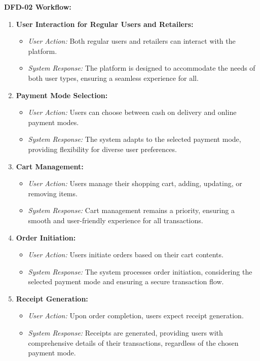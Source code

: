 \documentclass[a4paper,12pt]{article}
\begin{document}
\textbf{DFD-02 Workflow:}
\begin{enumerate}

\item \textbf{User Interaction for Regular Users and Retailers:}
   \begin{itemize}
      \item \textit{User Action:} Both regular users and retailers can interact with the platform.
      \item \textit{System Response:} The platform is designed to accommodate the needs of both user types, ensuring a seamless experience for all.
   \end{itemize}

\item \textbf{Payment Mode Selection:}
   \begin{itemize}
      \item \textit{User Action:} Users can choose between cash on delivery and online payment modes.
      \item \textit{System Response:} The system adapts to the selected payment mode, providing flexibility for diverse user preferences.
   \end{itemize}

\item \textbf{Cart Management:}
   \begin{itemize}
      \item \textit{User Action:} Users manage their shopping cart, adding, updating, or removing items.
      \item \textit{System Response:} Cart management remains a priority, ensuring a smooth and user-friendly experience for all transactions.
   \end{itemize}

\item \textbf{Order Initiation:}
   \begin{itemize}
      \item \textit{User Action:} Users initiate orders based on their cart contents.
      \item \textit{System Response:} The system processes order initiation, considering the selected payment mode and ensuring a secure transaction flow.
   \end{itemize}

\item \textbf{Receipt Generation:}
   \begin{itemize}
      \item \textit{User Action:} Upon order completion, users expect receipt generation.
      \item \textit{System Response:} Receipts are generated, providing users with comprehensive details of their transactions, regardless of the chosen payment mode.
   \end{itemize}

\end{enumerate}
\end{document}
